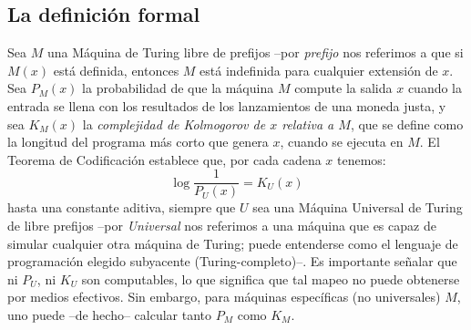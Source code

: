 \subsection{La definición formal}


Sea $M$ una Máquina de Turing libre de prefijos --por {\em prefijo} nos referimos a que si $M(x)$ está definida, entonces $M$ está indefinida para cualquier extensión de $x$. Sea $P_M(x)$ la probabilidad de que la máquina $M$ compute la salida $x$ cuando la entrada se llena con los resultados de los lanzamientos de una moneda justa, y sea $K_M(x)$ la {\em complejidad de Kolmogorov de $x$ relativa a $M$}, que se define como la longitud del programa más corto que genera $x$, cuando se ejecuta en $M$. El Teorema de Codificación establece que, por cada cadena $x$ tenemos:
%
\begin{equation}
\label{eqF}
\log \frac{1}{P_U(x)} = K_U(x)
\end{equation}
%
hasta una constante aditiva, siempre que $U$ sea una Máquina Universal de Turing de libre prefijos --por {\em Universal} nos referimos a una máquina que es capaz de simular cualquier otra máquina de Turing; puede entenderse como el lenguaje de programación elegido subyacente (Turing-completo)--. Es importante señalar que ni $P_U$, ni $K_U$ son computables, lo que significa que tal mapeo no puede obtenerse por medios efectivos. Sin embargo, para máquinas específicas (no universales) $M$, uno puede --de hecho-- calcular tanto $P_M$ como $K_M$.

